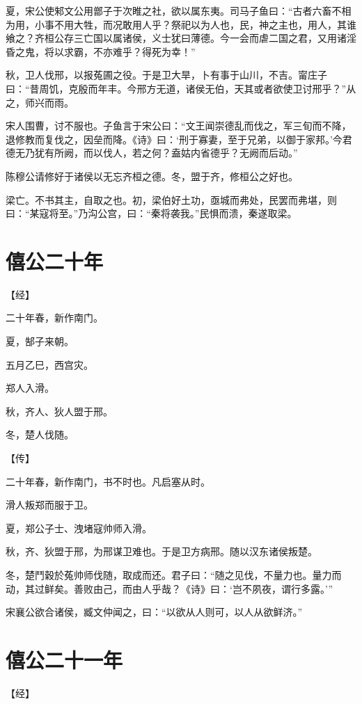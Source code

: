 \documentclass[a4paper,12pt,UTF8,twoside]{ctexbook}
\begin{document}
夏，宋公使邾文公用鄫子于次睢之社，欲以属东夷。司马子鱼曰：“古者六畜不相为用，小事不用大牲，而况敢用人乎？祭祀以为人也，民，神之主也，用人，其谁飨之？齐桓公存三亡国以属诸侯，义士犹曰薄德。今一会而虐二国之君，又用诸淫昏之鬼，将以求霸，不亦难乎？得死为幸！”

秋，卫人伐邢，以报菟圃之役。于是卫大旱，卜有事于山川，不吉。甯庄子曰：“昔周饥，克殷而年丰。今邢方无道，诸侯无伯，天其或者欲使卫讨邢乎？”从之，师兴而雨。

宋人围曹，讨不服也。子鱼言于宋公曰：“文王闻崇德乱而伐之，军三旬而不降，退修教而复伐之，因垒而降。《诗》曰：‘刑于寡妻，至于兄弟，以御于家邦。’今君德无乃犹有所阙，而以伐人，若之何？盍姑内省德乎？无阙而后动。”

陈穆公请修好于诸侯以无忘齐桓之德。冬，盟于齐，修桓公之好也。

梁亡。不书其主，自取之也。初，梁伯好土功，亟城而弗处，民罢而弗堪，则曰：“某寇将至。”乃沟公宫，曰：“秦将袭我。”民惧而溃，秦遂取梁。


\section{僖公二十年}


【经】

二十年春，新作南门。

夏，郜子来朝。

五月乙巳，西宫灾。

郑人入滑。

秋，齐人、狄人盟于邢。

冬，楚人伐随。

【传】

二十年春，新作南门，书不时也。凡启塞从时。

滑人叛郑而服于卫。

夏，郑公子士、洩堵寇帅师入滑。

秋，齐、狄盟于邢，为邢谋卫难也。于是卫方病邢。随以汉东诸侯叛楚。

冬，楚鬥穀於菟帅师伐随，取成而还。君子曰：“随之见伐，不量力也。量力而动，其过鲜矣。善败由己，而由人乎哉？《诗》曰：‘岂不夙夜，谓行多露。’”

宋襄公欲合诸侯，臧文仲闻之，曰：“以欲从人则可，以人从欲鲜济。”


\section{僖公二十一年}



【经】
\end{document}
